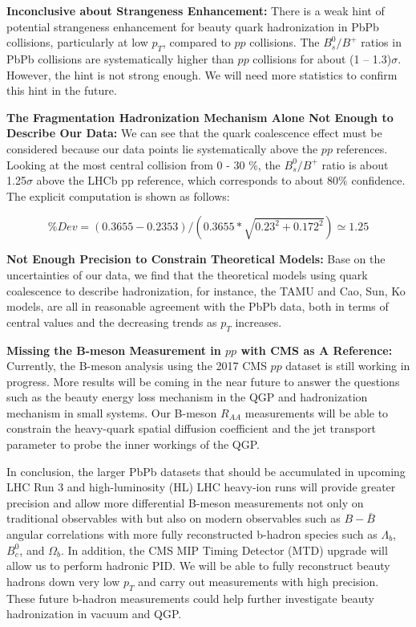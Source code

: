 \textbf{Inconclusive about Strangeness Enhancement:} There is a weak hint of potential strangeness enhancement for beauty quark hadronization in PbPb collisions, particularly at low $p_T$, compared to $pp$ collisions. The $B^0_s/B^+$ ratios in PbPb collisions are systematically higher than $pp$ collisions for about (1 -- 1.3)$\sigma$. However, the hint is not strong enough. We will need more statistics to confirm this hint in the future.

\textbf{The Fragmentation Hadronization Mechanism Alone Not Enough to Describe Our Data:} We can see that the quark coalescence effect must be considered because our data points lie systematically above the $pp$ references. Looking at the most central collision from 0 - 30 \%, the $B^0_s/B^+$ ratio is about 1.25$\sigma$ above the LHCb pp reference, which corresponds to about 80\% confidence. The explicit computation is shown as follows:

\begin{equation}
\% Dev = (0.3655 - 0.2353)/(0.3655 * \sqrt{0.23^2 + 0.172^2}) \simeq 1.25 
\end{equation}


\textbf{Not Enough Precision to Constrain Theoretical Models:} Base on the uncertainties of our data, we find that the theoretical models using quark coalescence to describe hadronization, for instance, the TAMU and Cao, Sun, Ko models, are all in reasonable agreement with the PbPb data, both in terms of central values and the decreasing trends as $p_T$ increases.

\textbf{Missing the B-meson Measurement in $pp$ with CMS as A Reference:} Currently, the B-meson analysis using the 2017 CMS $pp$ dataset is still working in progress. More results will be coming in the near future to answer the questions such as the beauty energy loss mechanism in the QGP and hadronization mechanism in small systems. Our B-meson $R_{AA}$ measurements will be able to constrain the heavy-quark spatial diffusion coefficient and the jet transport parameter to probe the inner workings of the QGP.

In conclusion, the larger PbPb datasets that should be accumulated in upcoming LHC Run 3 and high-luminosity (HL) LHC heavy-ion runs will provide greater precision and allow more differential B-meson measurements not only on traditional observables with but also on modern observables such as $B-\bar B$ angular correlations with more fully reconstructed b-hadron species such as $\Lambda_b$, $B^0_c$, and $\Omega_b$. In addition, the CMS MIP Timing Detector (MTD) upgrade \cite{CMSMTD} will allow us to perform hadronic PID. We will be able to fully reconstruct beauty hadrons down very low $p_T$ and carry out measurements with high precision. These future b-hadron measurements could help further investigate beauty hadronization in vacuum and QGP.


